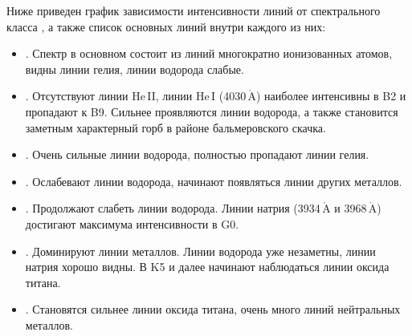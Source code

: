 Ниже приведен график зависимости интенсивности линий от спектрального класса , а также список основных линий внутри каждого из них:

\begin{itemize}
	\item {}. Спектр в основном состоит из линий  многократно ионизованных атомов, видны линии гелия, линии водорода слабые.
	\item {}. Отсутствуют линии He$\,$II, линии He$\,$I (4030$\,\mathring{\text{A}}$) наиболее интенсивны в B2 и пропадают к B9. Сильнее проявляются линии водорода, а также становится заметным характерный горб в районе бальмеровского скачка.
	\item {}. Очень сильные линии водорода, полностью пропадают линии гелия.
	\item {}. Ослабевают линии водорода, начинают появляться линии других металлов. 
	\item {}. Продолжают слабеть линии водорода. Линии натрия (3934$\,\mathring{\text{A}}$ и 3968$\,\mathring{\text{A}}$) достигают максимума интенсивности в G0.
	\item {}. Доминируют линии металлов. Линии водорода уже незаметны, линии натрия хорошо видны. В K5 и далее начинают наблюдаться линии оксида титана.
	\item {}. Становятся сильнее линии оксида титана, очень много линий нейтральных металлов.
\end{itemize}

